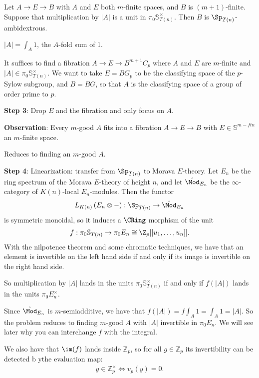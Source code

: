 \begin{lemma} Let $A \to E \to B$ with $A$ and $E$ both $m$-finite spaces, and $B$ is $(m+1)$-finite. Suppose that multiplication by $|A|$ is a unit in $\pi_0 \mathbb{S}_{T(n)} ^\times$. Then $B$ is $\Sp_{T(n)}$-ambidextrous.
\end{lemma}
$|A| = \int_A 1$, the $A$-fold sum of 1.

It suffices to find a fibration $A \to E \to B^{m+1} C_p$ where $A$ and $E$ are $m$-finite and $|A| \in \pi_0 \mathbb{S}_{T(n)} ^\times$. We want to take $E = BG_p$ to be the classifying space of the $p$-Sylow subgroup, and $B = BG$, so that $A$ is the classifying space of a group of order prime to $p$.

\textbf{Step 3}: Drop $E$ and the fibration and only focus on $A$.

\textbf{Observation}: Every $m$-good $A$ fits into a fibration $A \to E \to B$ with $E \in \mathbb{S}^{m-fin}$ an $m$-finite space.

Reduces to finding an $m$-good $A$.

\textbf{Step 4}: Linearization: transfer from $\Sp_{T(n)}$ to Morava $E$-theory. Let $E_n$ be the ring spectrum of the Morava $E$-theory of height $n$, and let $\hat{\Mod}_{E_n}$ be the $\infty$-category of $K(n)$-local $E_n$-modules. Then the functor
\begin{align*}
    L_{K(n)} \left( E_n \otimes - \right) : \Sp_{T(n)} \to \hat{\Mod}_{E_n}
\end{align*}
is symmetric monoidal, so it induces a $\CRing$ morphism of the unit
\begin{align*}
    f: \pi_0 \mathbb{S}_{T(n)} \to \pi_0 E_n \cong \Z_p [[u_1, \ldots, u_n]].
\end{align*}
With the nilpotence theorem and some chromatic techniques, we have that an element is invertible on the left hand side if and only if its image is invertible on the right hand side.

So multiplication by $|A|$ lands in the units $\pi_0 \mathbb{S}_{T(n)} ^\times$ if and only if $f(|A|)$ lands in the units $\pi_0 E_n^\times$.

Since $\hat{\Mod}_{E_n}$ is $m$-semiadditive, we have that $f(|A|) = f \int_A 1 = \int_A 1 = |A|$. So the problem reduces to finding $m$-good $A$ with $|A|$ invertible in $\pi_0 E_n$. We will see later why you can interchange $f$ with the integral.

We also have that $\im(f)$ lands inside $\mathbb{Z}_p$, so for all $g\in \mathbb{Z}_p$ its invertibility can be detected b ythe evaluation map:
\begin{align*}
    y\in \mathbb{Z}_p^\times \iff v_p(y) = 0.
\end{align*}

